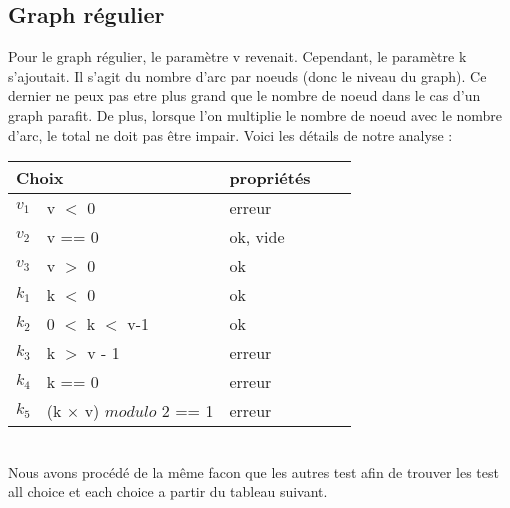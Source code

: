 \documentclass[11pt]{article}
\begin{document}
\subsection{Graph régulier}
Pour le graph régulier, le paramètre v revenait. Cependant, le paramètre k s'ajoutait.
Il s'agit du nombre d'arc par noeuds (donc le niveau du graph).
Ce dernier ne peux pas etre plus grand que le nombre de noeud dans le cas d'un graph parafit.
De plus, lorsque l'on multiplie le nombre de noeud avec le nombre d'arc, le total ne doit pas être impair. Voici les détails de notre analyse :
\begin{tabular}{|l|l|l|l|l|}
 \hline
 \multicolumn{2}{|l|}{Choix} & propriétés                                \\ \hline
 $v_1$                       & v $<$ 0                        & erreur   \\ \hline
 $v_2$                       & v == 0                         & ok, vide \\ \hline
 $v_3$                       & v $>$ 0                        & ok       \\ \hline \hline
 $k_1$                       & k $<$ 0                        & ok       \\ \hline
 $k_2$                       & 0 $<$ k $<$ v-1                & ok       \\ \hline
 $k_3$                       & k $>$ v - 1                    & erreur   \\ \hline
 $k_4$                       & k == 0                         & erreur   \\ \hline
 $k_5$                       & (k $\times$ v) $modulo$ 2 == 1 & erreur   \\ \hline
\end{tabular}
\\
Nous avons procédé de la même facon que les autres test afin de trouver les test all choice et each choice a partir du tableau suivant.
\end{document}
